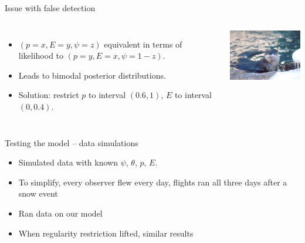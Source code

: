 \documentclass{beamer}
\begin{document}
\begin{frame}{Issue with false detection}
	\begin{columns}
		\column{5cm}
		\begin{itemize}
			\item $(p=x, E=y, \psi=z)$ equivalent in terms of likelihood to
			$(p=y,E=x,\psi=1-z)$.
			\item Leads to bimodal posterior distributions.
			\item Solution: restrict $p$ to interval $(0.6,1)$, $E$ to interval
			$(0,0.4)$.
		\end{itemize}
		\column{5cm}
		\includegraphics[width=5cm]{Figures/Pictures/cuteOtter6.jpg}
	\end{columns}
\end{frame}


\begin{frame}{Testing the model -- data simulations}
	\begin{itemize}
		\item Simulated data with known $\psi$, $\theta$, $p$, $E$.
		\item To simplify, every observer flew every day, flights ran all
		three days after a snow event
		\item Ran data on our model
		\item When regularity restriction lifted, similar results
	\end{itemize}
\end{frame}
\end{document}
